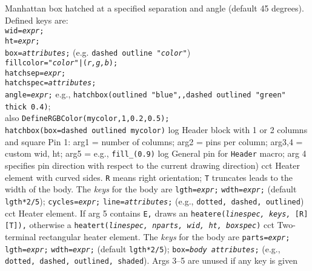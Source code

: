   {Manhattan box hatched at a specified separation
    and angle (default 45 degrees).
   Defined keys are:\\
    {\tt wid={\sl expr};}\\
    {\tt ht={\sl expr};}\\
    {\tt box={\sl attributes};} (e.g. {\tt dashed outline "{\sl color}"})\\
    {\tt fillcolor="{\sl color}"|({\sl r,g,b});}\\
    {\tt hatchsep={\sl expr};}\\
    {\tt hatchspec={\sl attributes};}\\
    {\tt angle={\sl expr};}%
 e.g.,
   {\tt hatchbox(outlined "blue",{},dashed outlined "green" thick 0.4)};\\
   also
   {\tt DefineRGBColor(mycolor,1,0.2,0.5);\\
        hatchbox(box=dashed outlined mycolor)}}%
%
  {log}%
  {Header block with 1 or 2 columns and square Pin 1:
   arg1 = number of columns;
   arg2 = pins per column;
   arg3,4 = custom wid, ht;
   arg5 = e.g., {\tt fill\_(0.9)}%
    }%
%
  {log}%
  {General pin for {\tt Header} macro; arg 4 specifies pin direction
   with respect to the current drawing direction)}%
%
  {cct}%
  {Heater element with curved sides.
    {\tt R} means right orientation;
    {\tt T} truncates leads to the width of the body.
    The {\sl keys} for the body are
    {\tt lgth={\sl expr};}%
    {\tt wdth={\sl expr};} (default {\tt lgth*2/5});
    {\tt cycles={\sl expr};}%
    {\tt line={\sl attributes};} (e.g., {\tt dotted, dashed, outlined})}%
%
  {cct}%
  {Heater element. If arg 5 contains {\tt E,}%
    draws an {\tt heatere({\sl linespec, keys,} [R][T]),}%
    otherwise a
    {\tt heatert({\sl linespec, nparts, wid, ht, boxspec})}}%
%
  {cct}%
  {Two-terminal rectangular heater element.
    The {\sl keys} for the body are
    {\tt parts={\sl expr};}%
    {\tt lgth={\sl expr};}%
    {\tt wdth={\sl expr};} (default {\tt lgth*2/5});
    {\tt box={\sl body attributes};}%
      (e.g., {\tt dotted, dashed, outlined, shaded}).
    Args 3--5 are unused if any key is given}%
